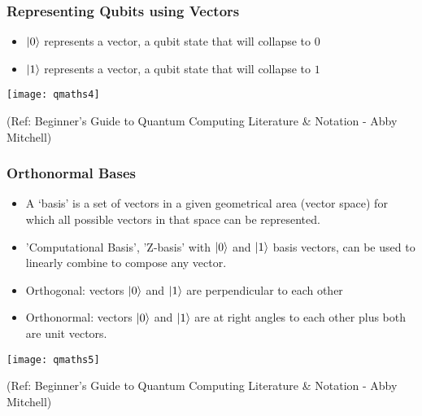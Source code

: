  \begin{frame}[fragile]\frametitle{Representing Qubits using Vectors}
\begin{itemize}
\item $ |{0}\rangle $ represents a vector, a qubit state that will collapse to $0$
\item $ |{1}\rangle $ represents a vector, a qubit state that will collapse to $1$
\end{itemize}

\begin{center}
\texttt{[image: qmaths4]}
\end{center}


\tiny{(Ref: Beginner’s Guide to Quantum Computing Literature \& Notation - Abby Mitchell)}

\end{frame}


 \begin{frame}[fragile]\frametitle{Orthonormal Bases}
\begin{itemize}
\item A ‘basis' is a set of vectors in a given geometrical area (vector
space) for which all possible vectors in that space can be represented.
\item 'Computational Basis', 'Z-basis' with $ |{0}\rangle $ and $ |{1}\rangle $ basis vectors, can be used to linearly combine to compose any vector.
\item Orthogonal: vectors $ |{0}\rangle $  and $ |{1}\rangle $  are perpendicular to each other

\item Orthonormal: vectors $ |{0}\rangle $  and $ |{1}\rangle $  are at right angles to each other plus both are unit vectors.
\end{itemize}

\begin{center}
\texttt{[image: qmaths5]}
\end{center}


\tiny{(Ref: Beginner’s Guide to Quantum Computing Literature \& Notation - Abby Mitchell)}

\end{frame}

